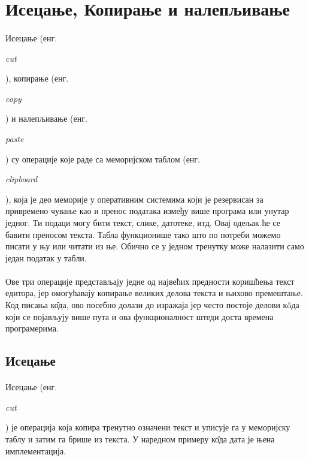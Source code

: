 \documentclass[12pt,oneside]{memoir}
\begin{document}
\section{Исецање, Копирање и налепљивање}
\paragraph{}
Исецање (енг. \begin{latinica}\textit{cut}\end{latinica}), копирање
(енг. \begin{latinica}\textit{copy}\end{latinica}) и налепљивање
(енг. \begin{latinica}\textit{paste}\end{latinica}) су операције
које раде са меморијском таблом 
(енг. \begin{latinica}\textit{clipboard}\end{latinica}), која је део меморије
у оперативним системима који је резервисан за привремено чување као и пренос
података између више програма или унутар једног. Ти подаци могу бити текст,
слике, датотеке, итд. Овај одељак ће се бавити преносом текста. Табла функционише
тако што по потреби можемо писати у њу или читати из ње. Обично се у једном
тренутку може налазити само један податак у табли.

\paragraph{}
Ове три операције представљају једне од највећих предности коришћења текст едитора,
јер омогућавају копирање великих делова текста и њихово премештање. Код писања к\^{о}да,
ово посебно долази до изражаја јер често постоје делови к\^{o}да који се појављују више пута и ова функционалност штеди доста времена програмерима.

\subsection{Исецање}
\paragraph{}
Исецање (енг. \begin{latinica}\textit{cut}\end{latinica}) је операција која
копира тренутно означени текст и уписује га у меморијску таблу и затим га
брише из текста. У наредном примеру к\^{о}да дата је њена имплементација.
\end{document}
